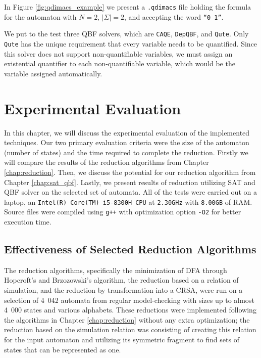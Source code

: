 In Figure \ref{fig:qdimacs_example} we present a \verb|.qdimacs| file holding the formula for the automaton with $N=2$, $|\Sigma|=2$, and accepting the word \texttt{``0 1''}.

We put to the test three QBF solvers, which are \texttt{CAQE}, \texttt{DepQBF}, and \texttt{Qute}. Only \texttt{Qute} has the unique requirement that every variable needs to be quantified. Since this solver does not support non-quantifiable variables, we must assign an existential quantifier to each non-quantifiable variable, which would be the variable assigned automatically.

\chapter{Experimental Evaluation}
\label{chap:evaluation}

In this chapter, we will discuss the experimental evaluation of the implemented techniques. Our two primary evaluation criteria were the size of the automaton (number of states) and the time required to complete the reduction. Firstly we will compare the results of the reduction algorithms from Chapter \ref{chap:reduction}. Then, we discuss the potential for our reduction algorithm from Chapter \ref{chap:sat_qbf}. Lastly, we present results of reduction utilizing SAT and QBF solver on the selected set of automata. All of the tests were carried out on a laptop, an \texttt{Intel(R) Core(TM) i5-8300H CPU} at \texttt{2.30GHz} with \texttt{8.00GB} of RAM. Source files were compiled using \texttt{g++} with optimization option \texttt{-O2} for better execution time.

\section{Effectiveness of Selected Reduction Algorithms}

The reduction algorithms, specifically the minimization of DFA through Hopcroft's and Brzozowski's algorithm, the reduction based on a relation of simulation, and the reduction by transformation into a CRSA, were run on a selection of 4\ 042 automata from regular model-checking \cite{armcNFA_page} with sizes up to almost 4\ 000 states and various alphabets. These reductions were implemented following the algorithms in Chapter \ref{chap:reduction} without any extra optimization; the reduction based on the simulation relation was consisting of creating this relation for the input automaton and utilizing its symmetric fragment to find sets of states that can be represented as one.

